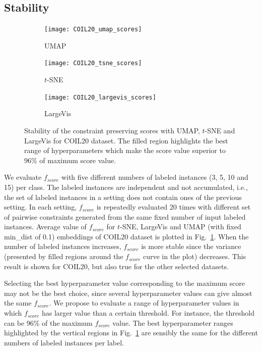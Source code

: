 \subsection{Stability}\label{sec:stability}

\begin{figure}[ht!]
    \begin{subfigure}[b]{0.32\linewidth}
         \centering
         \texttt{[image: COIL20\_umap\_scores]}
         \caption{UMAP}
    \end{subfigure}
    \hfill
    \begin{subfigure}[b]{0.32\linewidth}
         \centering
         \texttt{[image: COIL20\_tsne\_scores]}
         \caption{$t$-SNE}
    \end{subfigure}
    \hfill
    \begin{subfigure}[b]{0.32\linewidth}
         \centering
         \texttt{[image: COIL20\_largevis\_scores]}
         \caption{LargeVis}
    \end{subfigure}
    \caption{Stability of the constraint preserving scores with UMAP, $t$-SNE and LargeVis for COIL20 dataset.
    The filled region highlights the best range of hyperparameters which make the score value superior to 96\% of maximum score value.}
    \label{fig:score:stability:COIL20}
\end{figure}

We evaluate $f_{score}$ with five different numbers of labeled instances (3, 5, 10 and 15) per class.
The labeled instances are independent and not accumulated, i.e., the set of labeled instances in a setting does not contain ones of the previous setting.
In each setting, $f_{score}$ is repeatedly evaluated 20 times with different set of pairwise constraints generated from the same fixed number of input labeled instances.
Average value of $f_{score}$ for $t$-SNE, LargeVis and UMAP (with fixed {min\_dist} of 0.1) embeddings of COIL20 dataset is plotted in Fig.~\ref{fig:score:stability:COIL20}.
When the number of labeled instances increases, $f_{score}$ is more stable since the variance (presented by filled regions around the $f_{score}$ curve in the plot) decreases.
This result is shown for COIL20, but also true for the other selected datasets.

Selecting the best hyperparameter value corresponding to the maximum score may not be the best choice, since several hyperparameter values can give almost the same $f_{score}$.
We propose to evaluate a range of hyperparameter values in which $f_{score}$ has larger value than a certain threshold. %
For instance, the threshold can be 96\% of the maximum $f_{score}$ value.
The best hyperparameter ranges highlighted by the vertical regions in Fig.~\ref{fig:score:stability:COIL20} are sensibly the same for the different numbers of labeled instances per label.

